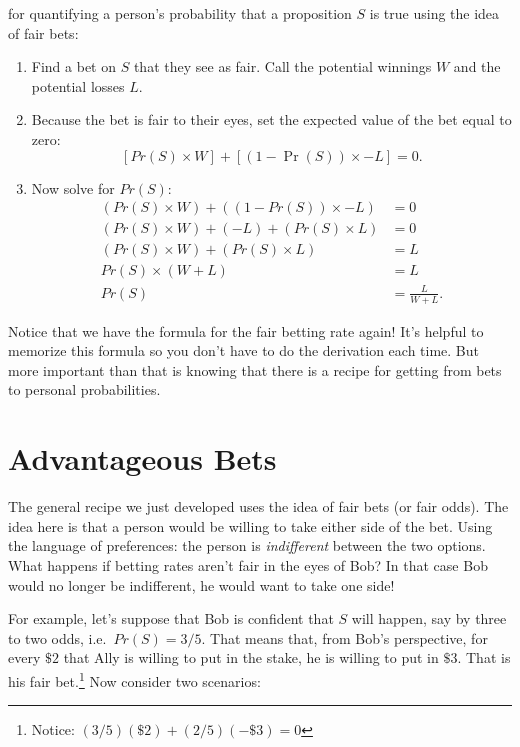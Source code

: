 \documentclass[]{tufte-book}
\providecommand{\tightlist}{%
  \setlength{\itemsep}{0pt}\setlength{\parskip}{0pt}}
\begin{document}
 for quantifying a person's probability that a proposition \(S\) is true using the idea of fair bets:

\begin{enumerate}
\def\labelenumi{\arabic{enumi}.}
\tightlist
\item
  Find a bet on \(S\) that they see as fair. Call the potential winnings \(W\) and the potential losses \(L\).
\item
  Because the bet is fair to their eyes, set the expected value of the bet equal to zero:
  \[ [Pr(S) \times W] + [(1-\Pr(S)) \times -L] = 0. \]
\item
  Now solve for \(Pr(S)\):
  \[
     \begin{aligned}
       (Pr(S) \times W)  + ((1-Pr(S)) \times -L) &= 0 \\
       (Pr(S) \times W)  + (-L) + (Pr(S) \times L) &= 0 \\
            (Pr(S) \times W) + (Pr(S) \times L) &= L \\
            Pr(S)\times (W + L) &= L \\
                                      Pr(S) &= \frac{L}{W+L}.
     \end{aligned}
   \]
\end{enumerate}

Notice that we have the formula for the fair betting rate again! It's helpful to memorize this formula so you don't have to do the derivation each time. But more important than that is knowing that there is a recipe for getting from bets to personal probabilities.

\hypertarget{advantageous-bets}{%
\section{Advantageous Bets}\label{advantageous-bets}}

The general recipe we just developed uses the idea of fair bets (or fair odds). The idea here is that a person would be willing to take either side of the bet. Using the language of preferences: the person is \emph{indifferent} between the two options. What happens if betting rates aren't fair in the eyes of Bob? In that case Bob would no longer be indifferent, he would want to take one side!

For example, let's suppose that Bob is confident that \(S\) will happen, say by three to two odds, i.e.~\(Pr(S)=3/5\). That means that, from Bob's perspective, for every \(\$2\) that Ally is willing to put in the stake, he is willing to put in \(\$3\). That is his fair bet.\footnote{Notice: \((3/5)(\$2) + (2/5)(-\$3) = 0\) } Now consider two scenarios:
\end{document}
